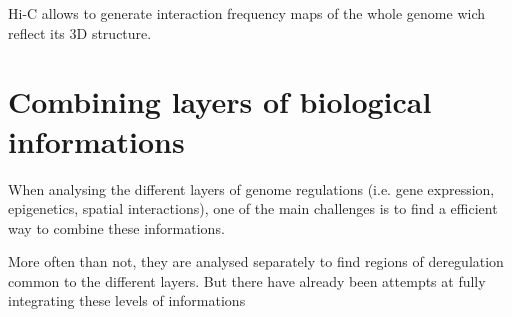 Hi-C allows to generate interaction frequency maps of the whole genome wich reflect its 3D structure.

\section{Combining layers of biological informations}

When analysing the different layers of genome regulations (i.e. gene expression, epigenetics, spatial interactions), one of the main challenges is to find a efficient way to combine these informations. 

More often than not, they are analysed separately to find regions of deregulation common to the different layers. But there have already been attempts at fully integrating these levels of informations %


